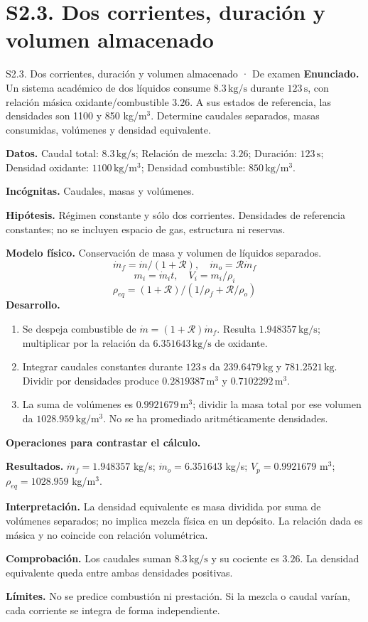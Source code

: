 \section{S2.3. Dos corrientes, duración y volumen almacenado}
\begin{studiumworked}{S2.3. Dos corrientes, duración y volumen almacenado · De examen}
\textbf{Enunciado.} Un sistema académico de dos líquidos consume $8.3\,\mathrm{kg/s}$ durante $123\,\mathrm{s}$, con relación másica oxidante/combustible $3.26$. A sus estados de referencia, las densidades son 1100 y 850 kg/m$^3$. Determine caudales separados, masas consumidas, volúmenes y densidad equivalente.

\textbf{Datos.} Caudal total: $8.3\,\mathrm{kg/s}$; Relación de mezcla: $3.26$; Duración: $123\,\mathrm{s}$; Densidad oxidante: $1100\,\mathrm{kg/m^3}$; Densidad combustible: $850\,\mathrm{kg/m^3}$.

\textbf{Incógnitas.} Caudales, masas y volúmenes.

\textbf{Hipótesis.} Régimen constante y sólo dos corrientes. Densidades de referencia constantes; no se incluyen espacio de gas, estructura ni reservas.

\textbf{Modelo físico.} Conservación de masa y volumen de líquidos separados.
\[\dot m_f=\dot m/(1+\mathcal R),\quad \dot m_o=\mathcal R\dot m_f\]
\[m_i=\dot m_it,\quad V_i=m_i/\rho_i\]
\[\rho_{eq}=(1+\mathcal R)/(1/\rho_f+\mathcal R/\rho_o)\]
\textbf{Desarrollo.}
\begin{enumerate}
\item Se despeja combustible de $\dot m=(1+\mathcal R)\dot m_f$. Resulta $1.948357\,\mathrm{kg/s}$; multiplicar por la relación da $6.351643\,\mathrm{kg/s}$ de oxidante.
\item Integrar caudales constantes durante $123\,\mathrm{s}$ da $239.6479\,\mathrm{kg}$ y $781.2521\,\mathrm{kg}$. Dividir por densidades produce $0.2819387\,\mathrm{m^3}$ y $0.7102292\,\mathrm{m^3}$.
\item La suma de volúmenes es $0.9921679\,\mathrm{m^3}$; dividir la masa total por ese volumen da $1028.959\,\mathrm{kg/m^3}$. No se ha promediado aritméticamente densidades.
\end{enumerate}
\textbf{Operaciones para contrastar el cálculo.}

\textbf{Resultados.} $\dot m_f=1.948357$ kg/s; $\dot m_o=6.351643$ kg/s; $V_p=0.9921679$ m$^3$; $\rho_{eq}=1028.959$ kg/m$^3$.

\textbf{Interpretación.} La densidad equivalente es masa dividida por suma de volúmenes separados; no implica mezcla física en un depósito. La relación dada es másica y no coincide con relación volumétrica.

\textbf{Comprobación.} Los caudales suman $8.3\,\mathrm{kg/s}$ y su cociente es $3.26$. La densidad equivalente queda entre ambas densidades positivas.

\textbf{Límites.} No se predice combustión ni prestación. Si la mezcla o caudal varían, cada corriente se integra de forma independiente.
\end{studiumworked}
